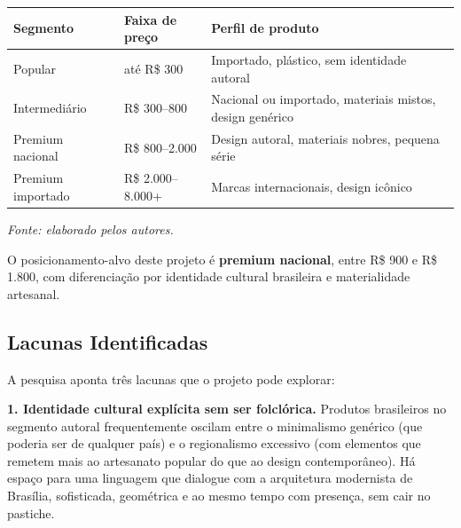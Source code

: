 \documentclass[
  12pt,
  a4paper,
  oneside,
  brazil
]{article}
\newcommand{\quadrofonte}[1]{\par\noindent\textit{Fonte: #1}\vspace{1em}\par}
\begin{document}
\begin{longtable}[]{@{}
  >{\raggedright\arraybackslash}p{}
  >{\raggedright\arraybackslash}p{}
  >{\raggedright\arraybackslash}p{}
  @{}}
\toprule\noalign{}
\begin{minipage}[b]{\linewidth}\raggedright
\textbf{Segmento}
\end{minipage} &
\begin{minipage}[b]{\linewidth}\raggedright
\textbf{Faixa de preço}
\end{minipage} &
\begin{minipage}[b]{\linewidth}\raggedright
\textbf{Perfil de produto}
\end{minipage} \\
\midrule\noalign{}
\endhead
\bottomrule\noalign{}
\endlastfoot
Popular & até R\$ 300 & Importado, plástico, sem identidade autoral \\
Intermediário & R\$ 300--800 & Nacional ou importado, materiais mistos, design
genérico \\
Premium nacional & R\$ 800--2.000 & Design autoral, materiais nobres, pequena série \\
Premium importado & R\$ 2.000--8.000+ & Marcas internacionais, design icônico \\
\end{longtable}

\quadrofonte{elaborado pelos autores.}

O posicionamento-alvo deste projeto é \textbf{premium nacional}, entre R\$ 900 e
R\$ 1.800, com diferenciação por identidade cultural brasileira e materialidade
artesanal.

\subsection{Lacunas Identificadas}

A pesquisa aponta três lacunas que o projeto pode explorar:

\noindent\textbf{1. Identidade cultural explícita sem ser folclórica.} Produtos
brasileiros no segmento autoral frequentemente oscilam entre o minimalismo genérico
(que poderia ser de qualquer país) e o regionalismo excessivo (com elementos que
remetem mais ao artesanato popular do que ao design contemporâneo). Há espaço para
uma linguagem que dialogue com a arquitetura modernista de Brasília, sofisticada,
geométrica e ao mesmo tempo com presença, sem cair no pastiche.
\end{document}
